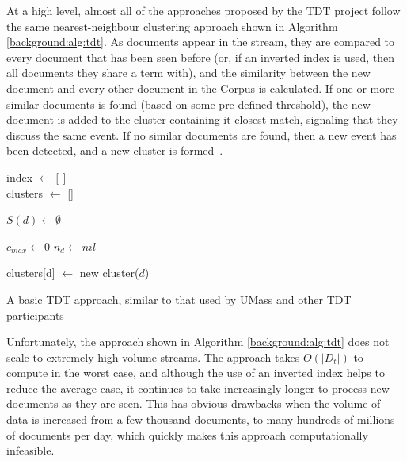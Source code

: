 At a high level, almost all of the approaches proposed by the TDT project follow the same nearest-neighbour clustering approach shown in Algorithm \ref{background:alg:tdt}.
As documents appear in the stream, they are compared to every document that has been seen before (or, if an inverted index is used, then all documents they share a term with), and the similarity between the new document and every other document in the Corpus is calculated.
If one or more similar documents is found (based on some pre-defined threshold), the new document is added to the cluster containing it closest match, signaling that they discuss the same event.
If no similar documents are found, then a new event has been detected, and a new cluster is formed~\citep{Allan:2000:FSD:354756.354843}.

\begin{algorithm}
	\DontPrintSemicolon
	index $\gets []$ \\
	clusters $\gets$ [] \\

	 {
		$S(d) \gets \emptyset$ 


		$c_{max} \gets 0$ 
		$n_{d} \gets nil$ 

		 {
			clusters[d] $\gets$ new cluster($d$) 
		}

	}
	\caption{A basic TDT approach, similar to that used by UMass and other TDT participants}
	\label{background:alg:tdt}
\end{algorithm}

Unfortunately, the approach shown in Algorithm \ref{background:alg:tdt} does not scale to extremely high volume streams.
The approach takes $O(|D_t|)$ to compute in the worst case, and although the use of an inverted index helps to reduce the average case, it continues to take increasingly longer to process new documents as they are seen.
This has obvious drawbacks when the volume of data is increased from a few thousand documents, to many hundreds of millions of documents per day, which quickly makes this approach computationally infeasible.

